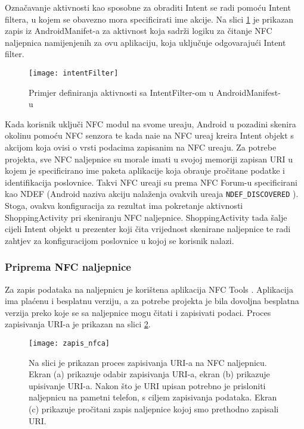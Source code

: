 Ozna\v{c}avanje aktivnosti kao sposobne za obraditi Intent se radi pomo\'{c}u Intent filtera, u kojem se obavezno mora specificirati ime akcije. Na slici \ref{fig:intentFilter} je prikazan zapis iz AndroidManifet-a za aktivnost koja sadr\v{z}i logiku za \v{c}itanje NFC naljepnica namijenjenih za ovu aplikaciju, koja uklju\v{c}uje odgovaraju\'{c}i Intent filter.

\begin{figure}[!htbp]
	\begin{center}
 \texttt{[image: intentFilter]}
 \caption{Primjer definiranja aktivnosti sa IntentFilter-om u AndroidManifest-u}
 \label{fig:intentFilter}
	\end{center}
\end{figure}

Kada korisnik uklju\v{c}i NFC modul na svome ure\dj aju, Android u pozadini skenira okolinu pomo\'{c}u NFC senzora te kada nai\dj e na NFC ure\dj aj kreira Intent objekt s akcijom koja ovisi o vrsti podacima zapisanim na NFC ure\dj aju. Za potrebe projekta, sve NFC naljepnice su morale imati u svojoj memoriji zapisan URI u kojem je specificirano ime paketa aplikacije koja obra\dj uje pro\v{c}itane podatke i identifikacija poslovnice. Takvi NFC ure\dj aji su prema NFC Forum-u specificirani kao NDEF \cite{NdefMessage} (Android naziva akciju nala\v{z}enja ovakvih ure\dj aja \verb|NDEF_DISCOVERED| \cite{ndef_discovered}).
Stoga, ovakva konfiguracija za rezultat ima pokretanje aktivnosti ShoppingActivity pri skeniranju NFC naljepnice. ShoppingActivity tada \v{s}alje cijeli Intent objekt u prezenter koji \v{c}ita vrijednost skenirane naljepnice te radi zahtjev za konfiguracijom poslovnice u kojoj se korisnik nalazi.

\subsubsection{Priprema NFC naljepnice}
Za zapis podataka na naljepnicu je kori\v{s}tena aplikacija NFC Tools \cite{nfcTools}. Aplikacija ima pla\'{c}enu i besplatnu verziju, a za potrebe projekta je bila dovoljna besplatna verzija preko koje se sa naljepnice mogu \v{c}itati i zapisivati podaci. Proces zapisivanja URI-a je prikazan na slici \ref{fig:zapisNfca}.


\begin{figure}[!htbp]
	\begin{center}
 \texttt{[image: zapis\_nfca]}
 \caption{Na slici je prikazan proces zapisivanja URI-a na NFC naljepnicu. Ekran (a) prikazuje odabir zapisivanja URI-a, ekran (b) prikazuje upisivanje URI-a. Nakon \v{s}to je URI upisan potrebno je prisloniti naljepnicu na pametni telefon, s ciljem zapisivanja podataka. Ekran (c) prikazuje pro\v{c}itani zapis naljepnice kojoj smo prethodno zapisali URI.}
 \label{fig:zapisNfca}
	\end{center}
\end{figure}

